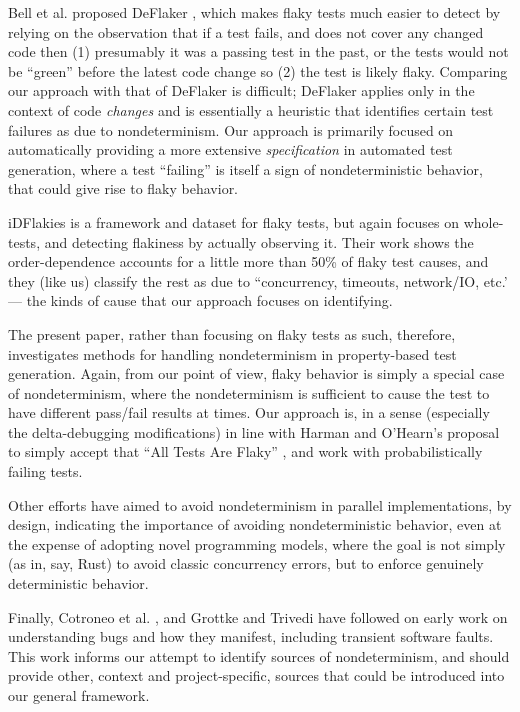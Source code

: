 Bell et al. proposed DeFlaker \cite{bell2018d}, which makes flaky tests much easier to detect by relying on the observation that if a test fails, and does not cover any changed code then (1) presumably it was a passing test in the past, or the tests would not be ``green'' before the latest code change so (2) the test is likely flaky.  Comparing our approach with that of DeFlaker is difficult; DeFlaker applies only in the context of code \emph{changes} and is essentially a heuristic that identifies certain test failures as due to nondeterminism.  Our approach is primarily focused on automatically providing a more extensive \emph{specification} in automated test generation, where a test ``failing'' is itself a sign of nondeterministic behavior, that could give rise to flaky behavior.

iDFlakies \cite{idflakies} is a framework and dataset for flaky tests, but again focuses on whole-tests, and detecting flakiness by actually observing it.  Their work shows the order-dependence accounts for a little more than 50\% of flaky test causes, and they (like us) classify the rest as due to ``concurrency, timeouts,
network/IO, etc.' --- the kinds of cause that our approach focuses on identifying.

The present paper, rather than focusing on flaky tests as such, therefore, investigates methods for handling nondeterminism in property-based test generation.  Again, from our point of view, flaky behavior is simply a special case of nondeterminism, where the nondeterminism is sufficient to cause the test to have different pass/fail results at times.  Our approach is, in a sense (especially the delta-debugging modifications) in line with Harman and O'Hearn's proposal to simply accept that ``All Tests Are Flaky'' \cite{StartupstoScaleups}, and work with probabilistically failing tests.

Other efforts \cite{ParallelDeterministic} have aimed to avoid nondeterminism in parallel implementations, by design, indicating the importance of avoiding nondeterministic behavior, even at the expense of adopting novel programming models, where the goal is not simply (as in, say, Rust) to avoid classic concurrency errors, but to enforce genuinely deterministic behavior.  

Finally, Cotroneo et al. \cite{CompBugs,FaultTriggers}, and Grottke and Trivedi \cite{GrottkeBugs} have followed on early work on understanding bugs and how they manifest, including transient \cite{Transient} software faults.  This work informs our attempt to identify sources of nondeterminism, and should provide other, context and project-specific, sources that could be introduced into our general framework.


